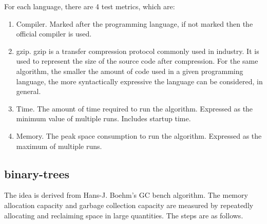 For each language, there are 4 test metrics, which are:

\begin{enumerate}
    \item Compiler. Marked after the programming language, if not marked then the official compiler is used.
    \item gzip. gzip is a transfer compression protocol commonly used in industry. It is used to represent the size of the source code after compression. For the same algorithm, the smaller the amount of code used in a given programming language, the more syntactically expressive the language can be considered, in general.
    \item Time. The amount of time required to run the algorithm. Expressed as the minimum value of multiple runs. Includes startup time.
    \item Memory. The peak space consumption to run the algorithm. Expressed as the maximum of multiple runs.
\end{enumerate}

\subsection{binary-trees}

The idea is derived from Hans-J. Boehm's GC bench algorithm. The memory allocation capacity and garbage collection capacity are measured by repeatedly allocating and reclaiming space in large quantities. The steps are as follows.

